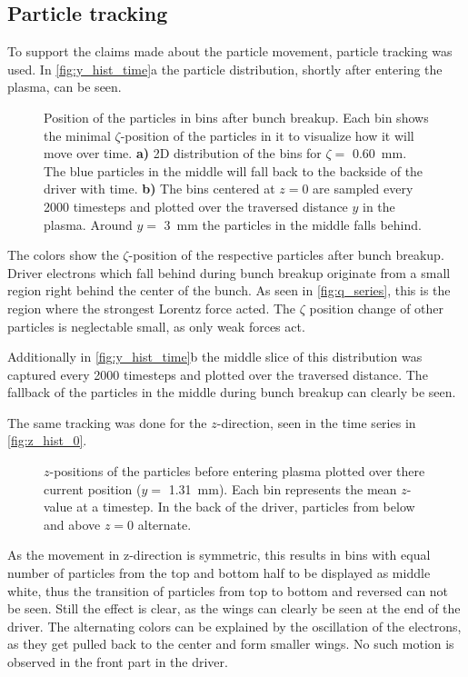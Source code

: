 \documentclass[bachelor_thesis]{subfiles}
\begin{document}
\subsection{Particle tracking}
To support the claims made about the particle movement, particle tracking was used. In \autoref{fig:y_hist_time}a the particle distribution, shortly after entering the plasma, can be seen.
\begin{figure}
	\centering
	
	\caption{Position of the particles in bins after bunch breakup. Each bin shows the minimal $\zeta$-position of the particles in it to visualize how it will move over time.
	\textbf{a)} 2D distribution of the bins for $\zeta=$ \qty{0.60}{\mm}. The blue particles in the middle will fall back to the backside of the driver with time.
	\textbf{b)} The bins centered at $z=0$ are sampled every 2000 timesteps and plotted over the traversed distance $y$ in the plasma. Around $y=$ \qty{3}{mm} the particles in the middle falls behind.}
	\label{fig:y_hist_time}
\end{figure}
The colors show the $\zeta$-position of the respective particles after bunch breakup. Driver electrons which fall behind during bunch breakup originate from a small region right behind the center of the bunch. 
As seen in \autoref{fig:q_series}, this is the region where the strongest Lorentz force acted.
The $\zeta$ position change of other particles is neglectable small, as only weak forces act.

Additionally in \autoref{fig:y_hist_time}b the middle slice of this distribution was captured every 2000 timesteps and plotted over the traversed distance. The fallback of the particles in the middle during bunch breakup can clearly be seen.

The same tracking was done for the $z$-direction, seen in the time series in \autoref{fig:z_hist_0}.
\begin{figure}
	\centering
	
	\caption{$z$-positions of the particles before entering plasma plotted over there current position ($y=$ \qty{1.31}{mm}). Each bin represents the mean $z$-value at a timestep. In the back of the driver, 
	particles from below and above $z=0$ alternate. }
	\label{fig:z_hist_0}
\end{figure}
As the movement in z-direction is symmetric, this results in bins with equal number of particles from the top and bottom half to be displayed as middle white, thus the transition of particles from top to bottom and reversed can not be seen. Still the effect is clear, as the wings can clearly be seen at the end of the driver.
The alternating colors can be explained by the oscillation of the electrons, as they get pulled back to the center and form smaller wings. No such motion is observed in the front part in the driver.
\end{document}
